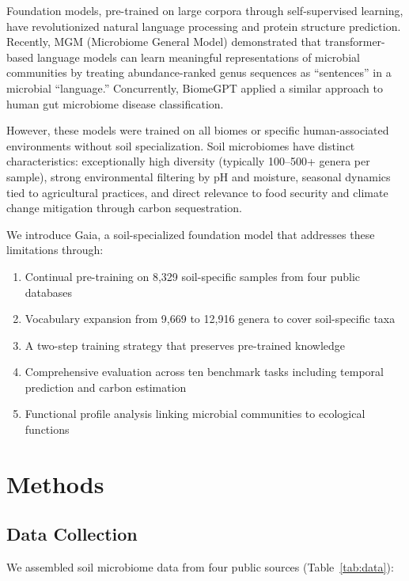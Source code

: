 \documentclass[11pt,a4paper]{article}
\begin{document}
Foundation models, pre-trained on large corpora through self-supervised learning, have revolutionized natural language processing and protein structure prediction. Recently, MGM (Microbiome General Model) \citep{mgm2024} demonstrated that transformer-based language models can learn meaningful representations of microbial communities by treating abundance-ranked genus sequences as ``sentences'' in a microbial ``language.'' Concurrently, BiomeGPT applied a similar approach to human gut microbiome disease classification.

However, these models were trained on all biomes or specific human-associated environments without soil specialization. Soil microbiomes have distinct characteristics: exceptionally high diversity (typically 100--500+ genera per sample), strong environmental filtering by pH and moisture, seasonal dynamics tied to agricultural practices, and direct relevance to food security and climate change mitigation through carbon sequestration.

We introduce Gaia, a soil-specialized foundation model that addresses these limitations through:
\begin{enumerate}
\item Continual pre-training on 8,329 soil-specific samples from four public databases
\item Vocabulary expansion from 9,669 to 12,916 genera to cover soil-specific taxa
\item A two-step training strategy that preserves pre-trained knowledge
\item Comprehensive evaluation across ten benchmark tasks including temporal prediction and carbon estimation
\item Functional profile analysis linking microbial communities to ecological functions
\end{enumerate}

\section{Methods}

\subsection{Data Collection}

We assembled soil microbiome data from four public sources (Table~\ref{tab:data}):
\end{document}
